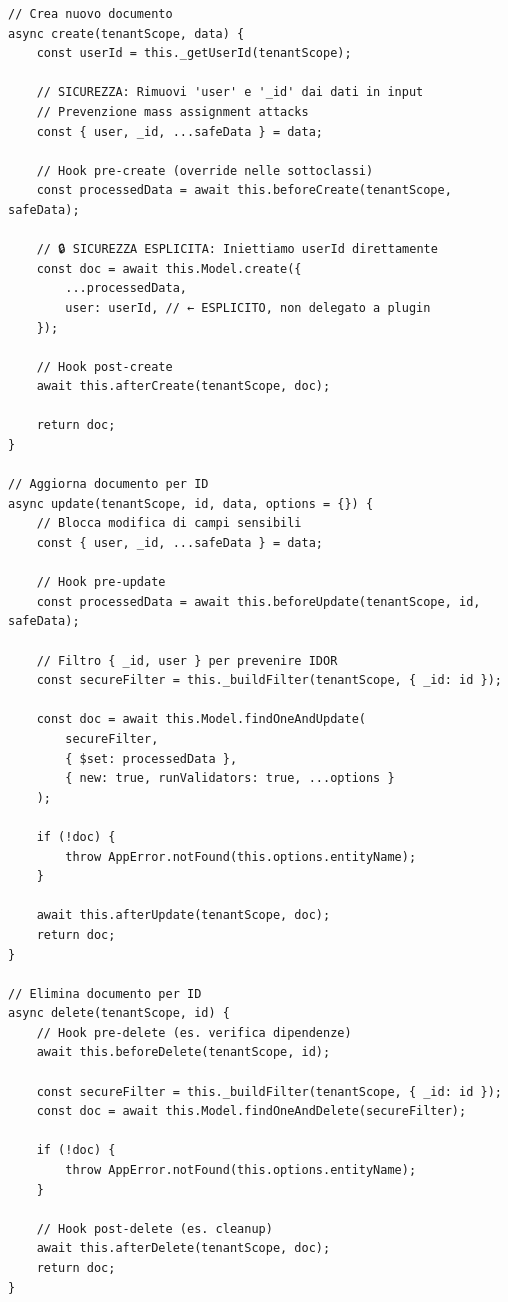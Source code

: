 \documentclass[11pt,a4paper]{article}
\begin{document}
\begin{lstlisting}
// Crea nuovo documento
async create(tenantScope, data) {
    const userId = this._getUserId(tenantScope);
    
    // SICUREZZA: Rimuovi 'user' e '_id' dai dati in input
    // Prevenzione mass assignment attacks
    const { user, _id, ...safeData } = data;
    
    // Hook pre-create (override nelle sottoclassi)
    const processedData = await this.beforeCreate(tenantScope, safeData);
    
    // 🔒 SICUREZZA ESPLICITA: Iniettiamo userId direttamente
    const doc = await this.Model.create({
        ...processedData,
        user: userId, // ← ESPLICITO, non delegato a plugin
    });
    
    // Hook post-create
    await this.afterCreate(tenantScope, doc);
    
    return doc;
}

// Aggiorna documento per ID
async update(tenantScope, id, data, options = {}) {
    // Blocca modifica di campi sensibili
    const { user, _id, ...safeData } = data;
    
    // Hook pre-update
    const processedData = await this.beforeUpdate(tenantScope, id, safeData);
    
    // Filtro { _id, user } per prevenire IDOR
    const secureFilter = this._buildFilter(tenantScope, { _id: id });
    
    const doc = await this.Model.findOneAndUpdate(
        secureFilter,
        { $set: processedData },
        { new: true, runValidators: true, ...options }
    );
    
    if (!doc) {
        throw AppError.notFound(this.options.entityName);
    }
    
    await this.afterUpdate(tenantScope, doc);
    return doc;
}

// Elimina documento per ID
async delete(tenantScope, id) {
    // Hook pre-delete (es. verifica dipendenze)
    await this.beforeDelete(tenantScope, id);
    
    const secureFilter = this._buildFilter(tenantScope, { _id: id });
    const doc = await this.Model.findOneAndDelete(secureFilter);
    
    if (!doc) {
        throw AppError.notFound(this.options.entityName);
    }
    
    // Hook post-delete (es. cleanup)
    await this.afterDelete(tenantScope, doc);
    return doc;
}
\end{lstlisting}
\end{document}
